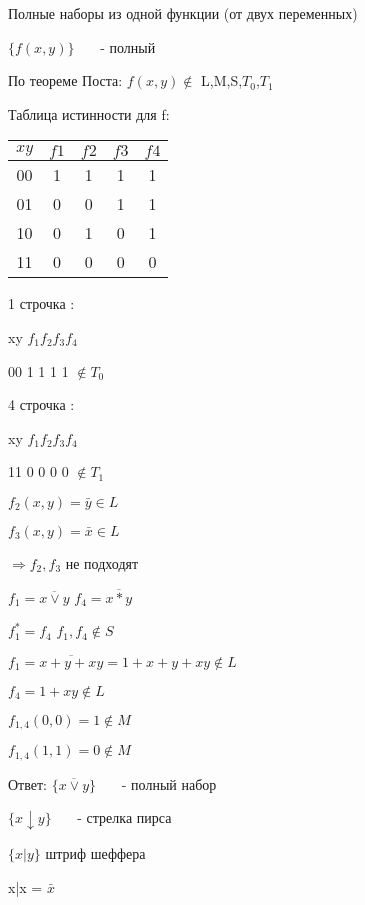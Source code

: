 \documentclass[russian]{lecture-notes}
\begin{document}
    Полные наборы из одной функции (от двух переменных)

    $\{f(x,y)\}$ ~~~- полный

    По теореме Поста: $f(x,y) \notin $ L,M,S,$T_{0}$,$T_{1}$

    Таблица истинности для f:

    \begin{table}[h!]
        \begin{tabular}{|c|c|c|c|c|}
            \hline
            $xy$ & $f1$ & $f2$ & $f3$ & $f4$ \\ \hline
            00     & 1    & 1    & 1    & 1    \\ \hline
            01     & 0    & 0    & 1    & 1    \\ \hline
            10     & 0    & 1    & 0    & 1    \\ \hline
            11     & 0    & 0    & 0    & 0    \\ \hline
        \end{tabular}
    \end{table}

    1 строчка :

    xy $f_{1} f_{2} f_{3} f_{4}$

    00 1 1 1 1 $\notin T_{0}$

    4 строчка :

    xy $f_{1} f_{2} f_{3} f_{4}$

    11 0 0 0 0 $\notin T_{1}$


    $f_{2}(x,y) = \bar{y} \in L$

    $f_{3}(x,y) = \bar{x} \in L$

    $\Rightarrow f_{2},f_{3}$ не подходят

    $f_{1} = \overline{x \lor y}$ $ f_{4} = \overline{x * y}$

    $f_{1}^{*} = f_{4}$ \quad $f_{1},f_{4} \notin S$

    $f_{1} = \overline{x + y + xy} = 1 + x + y +xy \notin L$

    $f_{4} = 1+xy \notin L$

    $f_{1,4}(0,0) = 1 \notin M$

    $f_{1,4}(1,1) = 0 \notin M$

    Ответ: $\{\overline{x \lor y}\}$ ~~~- полный набор

    $\{x \downarrow y \}$ ~~~- стрелка пирса

    $\{x | y\}$ штриф шеффера

    x|x = $\bar{x}$
\end{document}
